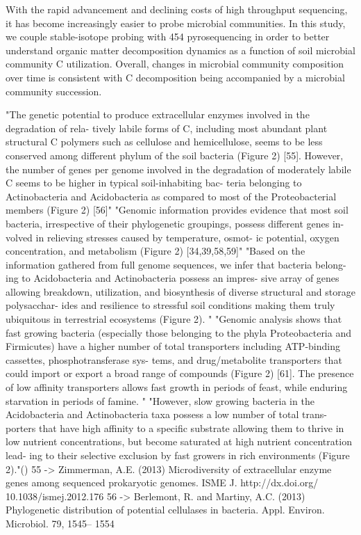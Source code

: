 With the rapid advancement and declining costs of high throughput sequencing, it has become increasingly easier to probe microbial communities.  In this study, we couple stable-isotope probing with 454 pyrosequencing in order to better understand organic matter decomposition dynamics as a function of soil microbial community C utilization. Overall, changes in microbial community composition over time is consistent with C decomposition being accompanied by a microbial community succession. 




"The genetic potential to produce extracellular enzymes involved in the degradation of rela- tively labile forms of C, including most abundant plant structural C polymers such as cellulose and hemicellulose, seems to be less conserved among different phylum of the soil bacteria (Figure 2) [55]. However, the number of genes per genome involved in the degradation of moderately labile C seems to be higher in typical soil-inhabiting bac- teria belonging to Actinobacteria and Acidobacteria as compared to most of the Proteobacterial members (Figure 2) [56]" "Genomic information provides evidence that most soil bacteria, irrespective of their phylogenetic groupings, possess different genes in- volved in relieving stresses caused by temperature, osmot- ic potential, oxygen concentration, and metabolism (Figure 2) [34,39,58,59]" 
"Based on the information gathered from full genome sequences, we infer that bacteria belong- ing to Acidobacteria and Actinobacteria possess an impres- sive array of genes allowing breakdown, utilization, and biosynthesis of diverse structural and storage polysacchar- ides and resilience to stressful soil conditions making them truly ubiquitous in terrestrial ecosystems (Figure 2). " "Genomic analysis shows that fast growing bacteria (especially those belonging to the phyla Proteobacteria and Firmicutes) have a higher number of total transporters including ATP-binding cassettes, phosphotransferase sys- tems, and drug/metabolite transporters that could import or export a broad range of compounds (Figure 2) [61]. The presence of low affinity transporters allows fast growth in periods of feast, while enduring starvation in periods of famine. "
"However, slow growing bacteria in the Acidobacteria and Actinobacteria taxa possess a low number of total trans- porters that have high affinity to a specific substrate allowing them to thrive in low nutrient concentrations, but become saturated at high nutrient concentration lead- ing to their selective exclusion by fast growers in rich environments (Figure 2)."(\cite{Trivedi_2013}) 55 -> Zimmerman, A.E. (2013) Microdiversity of extracellular enzyme genes among sequenced prokaryotic genomes. ISME J. http://dx.doi.org/ 10.1038/ismej.2012.176
56 -> Berlemont, R. and Martiny, A.C. (2013) Phylogenetic distribution of potential cellulases in bacteria. Appl. Environ. Microbiol. 79, 1545– 1554

